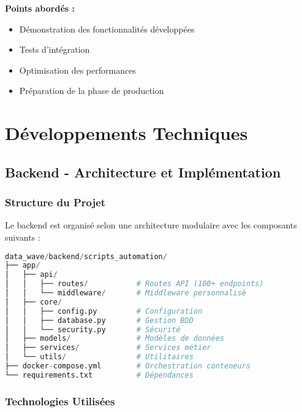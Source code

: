 \documentclass[12pt,a4paper]{article}
\begin{document}
\textbf{Points abordés :}
\begin{itemize}
    \item Démonstration des fonctionnalités développées
    \item Tests d'intégration
    \item Optimisation des performances
    \item Préparation de la phase de production
\end{itemize}

\section{Développements Techniques}

\subsection{Backend - Architecture et Implémentation}

\subsubsection{Structure du Projet}
Le backend est organisé selon une architecture modulaire avec les composants suivants :

\begin{lstlisting}[language=Python, caption=Structure du backend]
data_wave/backend/scripts_automation/
├── app/
│   ├── api/
│   │   ├── routes/           # Routes API (100+ endpoints)
│   │   └── middleware/       # Middleware personnalisé
│   ├── core/
│   │   ├── config.py         # Configuration
│   │   ├── database.py       # Gestion BDD
│   │   └── security.py       # Sécurité
│   ├── models/               # Modèles de données
│   ├── services/             # Services métier
│   └── utils/                # Utilitaires
├── docker-compose.yml        # Orchestration conteneurs
└── requirements.txt          # Dépendances
\end{lstlisting}

\subsubsection{Technologies Utilisées}
\end{document}
